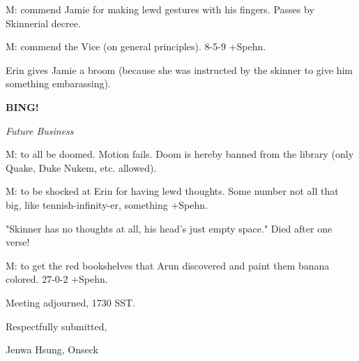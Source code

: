 \documentclass[12pt]{article}
\newcommand{\bing}{{\bf BING!} }
\newcommand{\goto}[1]{\bing \vskip 12pt \centerline{{\em{#1}}}}
\begin{document}
M: commend Jamie for making lewd gestures with his fingers. Passes by Skinnerial decree.

M: commend the Vice (on general principles). 8-5-9 +Spehn.

Erin gives Jamie a broom (because she was instructed by the skinner to give him something embarassing).

\goto{Future Business}

M: to all be doomed. Motion fails. Doom is hereby banned from the library (only Quake, Duke Nukem, etc. allowed).

M: to be shocked at Erin for having lewd thoughts. Some number not all that big, like tennish-infinity-er, something +Spehn.

"Skinner has no thoughts at all, his head's just empty space." Died after one verse!

M: to get the red bookshelves that Arun discovered and paint them banana colored. 27-0-2 +Spehn.

\vspace{12pt}

\noindent
Meeting adjourned, 1730 SST.

\vspace{18pt}

\centerline{Respectfully submitted,}
\centerline{Jenwa Hsung, Onseck}
\end{document}
